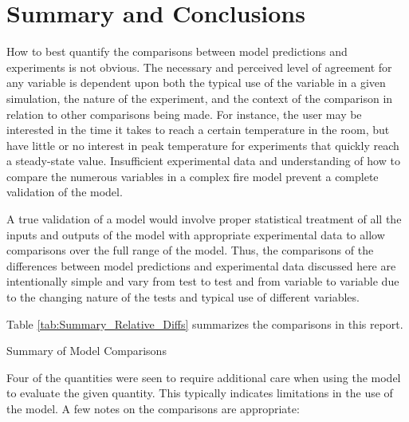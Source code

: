 	\chapter{Summary and Conclusions}

How to best quantify the comparisons between model predictions and experiments is not obvious. The necessary and perceived level of agreement for any variable is dependent upon both the typical use of the variable in a given simulation, the nature of the experiment, and the context of the comparison in relation to other comparisons being made. For instance, the user may be interested in the time it takes to reach a certain temperature in the room, but have little or no interest in peak temperature for experiments that quickly reach a steady-state value. Insufficient experimental data and understanding of how to compare the numerous variables in a complex fire model prevent a complete validation of the model. 

A true validation of a model would involve proper statistical treatment of all the inputs and outputs of the model with appropriate experimental data to allow comparisons over the full range of the model. Thus, the comparisons of the differences between model predictions and experimental data discussed here are intentionally simple and vary from test to test and from variable to variable due to the changing nature of the tests and typical use of different variables.

Table \ref{tab:Summary_Relative_Diffs} summarizes the comparisons in this report.

\begin{table}

\caption{Summary of Model Comparisons}
\label{tab:Summary_Relative_Diffs}
\vspace{0.1in}


\end{table}

Four of the quantities were seen to require additional care when using the model to evaluate the given quantity.  This typically indicates limitations in the use of the model.  A few notes on the comparisons are appropriate:

